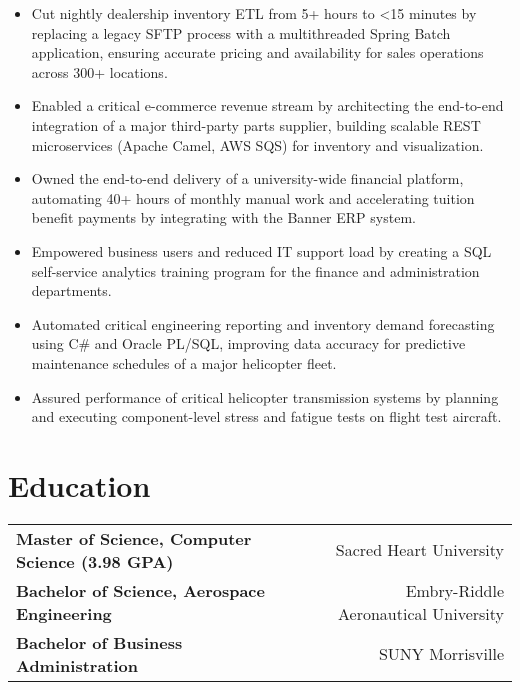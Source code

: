 \begin{itemize}[leftmargin=*]
    \item Cut nightly dealership inventory ETL from 5+ hours to <15 minutes by replacing a legacy SFTP process with a multithreaded Spring Batch application, ensuring accurate pricing and availability for sales operations across 300+ locations.
    \item Enabled a critical e-commerce revenue stream by architecting the end-to-end integration of a major third-party parts supplier, building scalable REST microservices (Apache Camel, AWS SQS) for inventory and visualization.
\end{itemize}
\vspace{\jobGroupBottomMargin}

\begin{itemize}[leftmargin=*]
    \item Owned the end-to-end delivery of a university-wide financial platform, automating 40+ hours of monthly manual work and accelerating tuition benefit payments by integrating with the Banner ERP system.
    \item Empowered business users and reduced IT support load by creating a SQL self-service analytics training program for the finance and administration departments.
\end{itemize}
\vspace{\jobGroupBottomMargin}

\begin{itemize}[leftmargin=*]
    \item Automated critical engineering reporting and inventory demand forecasting using C\# and Oracle PL/SQL, improving data accuracy for predictive maintenance schedules of a major helicopter fleet.
    \item Assured performance of critical helicopter transmission systems by planning and executing component-level stress and fatigue tests on flight test aircraft.
\end{itemize}

\section*{Education}
\noindent
\begin{tabularx}{\textwidth}{@{}Xr@{}}
    \textbf{Master of Science, Computer Science \small{(3.98 GPA)}} & Sacred Heart University \\
    \textbf{Bachelor of Science, Aerospace Engineering} & Embry-Riddle Aeronautical University \\
    \textbf{Bachelor of Business Administration} & SUNY Morrisville \\
\end{tabularx}